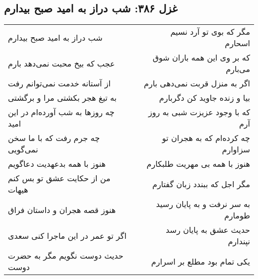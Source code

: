 \begin{center}
\section*{غزل ۳۸۶: شب دراز به امید صبح بیدارم}
\label{sec:386}
\begin{longtable}{l p{0.5cm} r}
شب دراز به امید صبح بیدارم
&&
مگر که بوی تو آرد نسیم اسحارم
\\
عجب که بیخ محبت نمی‌دهد بارم
&&
که بر وی این همه باران شوق می‌بارم
\\
از آستانه خدمت نمی‌توانم رفت
&&
اگر به منزل قربت نمی‌دهی بارم
\\
به تیغ هجر بکشتی مرا و برگشتی
&&
بیا و زنده جاوید کن دگربارم
\\
چه روزها به شب آورده‌ام در این امید
&&
که با وجود عزیزت شبی به روز آرم
\\
چه جرم رفت که با ما سخن نمی‌گویی
&&
چه کرده‌ام که به هجران تو سزاوارم
\\
هنوز با همه بدعهدیت دعاگویم
&&
هنوز با همه بی مهریت طلبکارم
\\
من از حکایت عشق تو بس کنم هیهات
&&
مگر اجل که ببندد زبان گفتارم
\\
هنوز قصه هجران و داستان فراق
&&
به سر نرفت و به پایان رسید طومارم
\\
اگر تو عمر در این ماجرا کنی سعدی
&&
حدیث عشق به پایان رسد نپندارم
\\
حدیث دوست نگویم مگر به حضرت دوست
&&
یکی تمام بود مطلع بر اسرارم
\\
\end{longtable}
\end{center}
